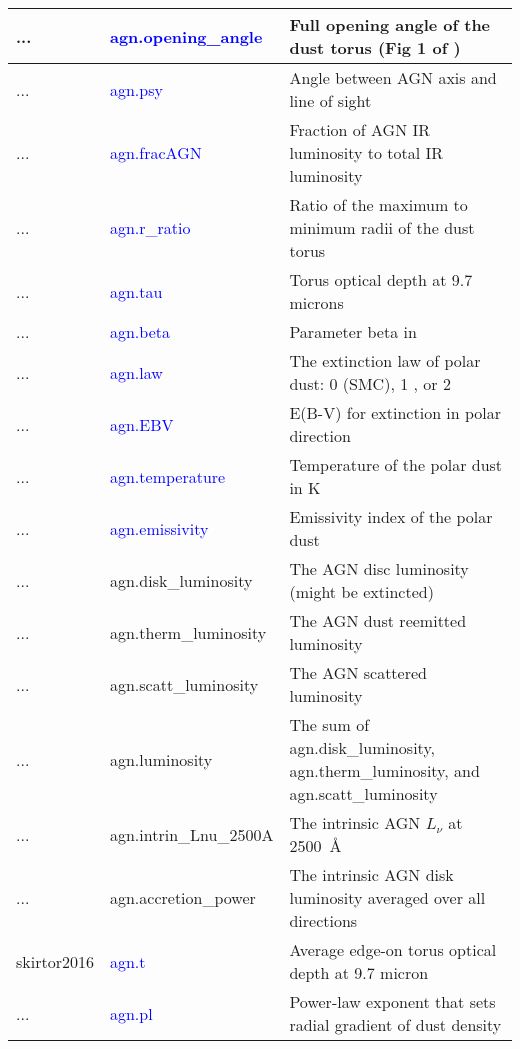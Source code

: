 \begin{longtable}{| p{} | p{} | p{} |}
...       & \textcolor{blue}{agn.opening\_angle}   & Full opening angle of the dust torus (Fig 1 of \cite{fritz06}) \\ \hline
...       & \textcolor{blue}{agn.psy}              & Angle between AGN axis and line of sight \\ \hline
...       & \textcolor{blue}{agn.fracAGN}          & Fraction of AGN IR luminosity to total IR luminosity \\ \hline
...       & \textcolor{blue}{agn.r\_ratio}         & Ratio of the maximum to minimum radii of the dust torus \\ \hline
...       & \textcolor{blue}{agn.tau}              & Torus optical depth at 9.7 microns \\ \hline
...       & \textcolor{blue}{agn.beta}             & Parameter beta in \cite{fritz06} \\ \hline
...       & \textcolor{blue}{agn.law}              & The extinction law of polar dust: 0 (SMC), 1 \cite{calzetti00}, or 2 \cite{gaskell04} \\ \hline
...       & \textcolor{blue}{agn.EBV}              & E(B-V) for extinction in polar direction \\ \hline
...       & \textcolor{blue}{agn.temperature}      & Temperature of the polar dust in K \\ \hline
...       & \textcolor{blue}{agn.emissivity}       & Emissivity index of the polar dust \\ \hline
...       & agn.disk\_luminosity                   & The AGN disc luminosity (might be extincted) \\ \hline
...       & agn.therm\_luminosity                  & The AGN dust reemitted luminosity \\ \hline
...       & agn.scatt\_luminosity                  & The AGN scattered luminosity \\ \hline
...       & agn.luminosity                         & The sum of agn.disk\_luminosity, agn.therm\_luminosity, and agn.scatt\_luminosity \\ \hline
...       & agn.intrin\_Lnu\_2500A                 & The intrinsic AGN $L_\nu$ at 2500~\AA\ \\ \hline
...       & agn.accretion\_power                   & The intrinsic AGN disk luminosity averaged over all directions \\ \hline
skirtor2016 & \textcolor{blue}{agn.t}           & Average edge-on torus optical depth at 9.7 micron \\ \hline
...         & \textcolor{blue}{agn.pl}          & Power-law exponent that sets radial gradient of dust density \\ \hline

\end{longtable}
